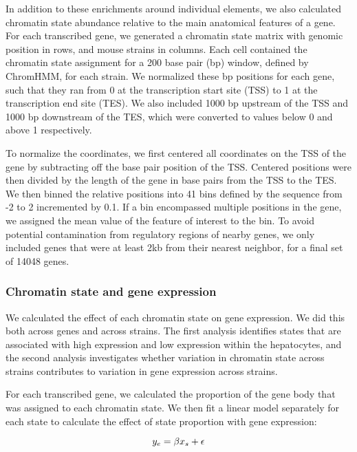 \documentclass[10pt,letterpaper]{article}
\begin{document}
In addition to these enrichments around individual elements, we also
calculated chromatin state abundance relative to the main anatomical
features of a gene. For each transcribed gene, we generated a chromatin
state matrix with genomic position in rows, and mouse strains in
columns. Each cell contained the chromatin state assignment for a 200
base pair (bp) window, defined by ChromHMM, for each strain. We
normalized these bp positions for each gene, such that they ran from 0
at the transcription start site (TSS) to 1 at the transcription end site
(TES). We also included 1000 bp upstream of the TSS and 1000 bp
downstream of the TES, which were converted to values below 0 and above
1 respectively.

To normalize the coordinates, we first centered all coordinates on the
TSS of the gene by subtracting off the base pair position of the TSS.
Centered positions were then divided by the length of the gene in base
pairs from the TSS to the TES. We then binned the relative positions
into 41 bins defined by the sequence from -2 to 2 incremented by 0.1. If
a bin encompassed multiple positions in the gene, we assigned the mean
value of the feature of interest to the bin. To avoid potential
contamination from regulatory regions of nearby genes, we only included
genes that were at least 2kb from their nearest neighbor, for a final
set of 14048 genes.

\hypertarget{chromatin-state-and-gene-expression}{%
\subsubsection{Chromatin state and gene
expression}\label{chromatin-state-and-gene-expression}}

We calculated the effect of each chromatin state on gene expression. We
did this both across genes and across strains. The first analysis
identifies states that are associated with high expression and low
expression within the hepatocytes, and the second analysis investigates
whether variation in chromatin state across strains contributes to
variation in gene expression across strains.

For each transcribed gene, we calculated the proportion of the gene body
that was assigned to each chromatin state. We then fit a linear model
separately for each state to calculate the effect of state proportion
with gene expression:

\begin{equation*}{\label{eqn:chromatin_effect}}
y_{e} = \beta x_{s} + \epsilon
\end{equation*}
\end{document}
